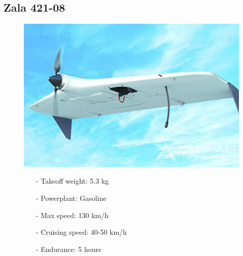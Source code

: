\documentclass{article}
\begin{document}
\subsection{Zala 421-08}
\begin{figure}[h]
    \begin{minipage}[b]{.45\linewidth}
        \centering
        \includegraphics[width=0.7\linewidth]{Aircraft pics/zala 421-08.png}
    \end{minipage}\hfill
    \begin{minipage}[b]{0.45\linewidth}
        \begin{itemize}
            \item [-] Takeoff weight: 5.3 kg
            \item [-] Powerplant: Gasoline
            \item [-] Max speed: 130 km/h 
            \item [-] Cruising speed: 40-50 km/h 
            \item [-] Endurance: 5 hours
        \end{itemize}
    \end{minipage}
\end{figure}

\vspace{\fill}
\end{document}
